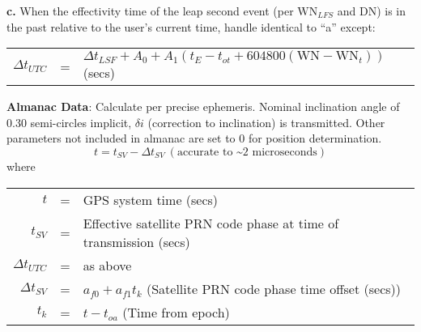 \documentclass[
    letterpaper,
    11pt,               %
    extrafontsizes,
    oneside,            %
    onecolumn,
    openany,            %
    final,              %
]{memoir}
\begin{document}
\textbf{c.} When the effectivity time of the leap second event (per $\text{WN}_{LFS}$ and DN) is in the past relative to the user's current time, handle identical to ``a'' except:
\begin{longtabu}{r c l}
  $\Delta t_{UTC}$ & = & $\Delta t_{LSF} + A_{0} + A_{1} (t_{E} - t_{ot} + 604800 (\text{WN} - \text{WN}_{t}))$ (secs) \\
\end{longtabu}

\textbf{Almanac Data}: Calculate per precise ephemeris. Nominal inclination angle of 0.30 semi-circles implicit, $\delta i$ (correction to inclination) is transmitted. Other parameters not included in almanac are set to 0 for position determination.
\[
  t = t_{SV} - \Delta t_{SV}~(\text{accurate to \textasciitilde 2 microseconds})
\]
where
\begin{longtabu}{r c l}
$t$ & = & GPS system time (secs) \\
$t_{SV}$ & = & Effective satellite PRN code phase at time of transmission (secs) \\
$\Delta t_{UTC}$ & = & as above \\
$\Delta t_{SV}$ & = & $a_{f0} + a_{f1} t_{k}$ (Satellite PRN code phase time offset (secs)) \\
$t_{k}$ & = & $t - t_{oa}$ (Time from epoch) \\
\end{longtabu}
\pagebreak
\end{document}
